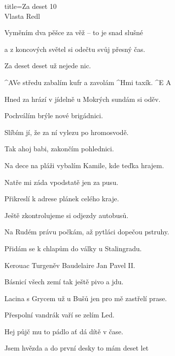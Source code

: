 \begin{song}{title=\predtitle\centering Za deset 10 \\\large Vlasta Redl  \vspace*{-0.3cm}}
{\begin{centerjustified}
\begin{varwidth}[t]{0.55\textwidth}
	Vyměním dva pěšce za věž -- to je snad slušné

	a z koncových světel si odečtu svůj přesný čas.

	Za deset deset už nejede nic.

	^{A}Ve středu zabalím kufr a zavolám ^{Hmi \z}taxík. ^{E A}

\end{varwidth}


\begin{varwidth}[t]{0.70\textwidth}\setlength{\parindent}{0.0cm}  %
	Hned za hrází v jídelně u Mokrých sundám si oděv.

	Pochválím brýle nové brigádnici.

	Slíbím jí, že za ní vylezu po hromosvodě.

	Tak ahoj babi, zakončím pohlednici.

	Na dece na pláži vybalím Kamile, kde teďka hrajem.

	Natře mi záda vpodstatě jen za pusu.

	Přikreslí k adrese plánek celého kraje.

	Ještě zkontrolujeme si odjezdy autobusů.


	Na Rudém právu počkám, až pytláci dopečou pstruhy.

	Přidám se k chlapům do války u Stalingradu.

	Kerouac Turgeněv Baudelaire Jan Pavel II.

	Básnicí všech zemí tak ještě pivo a jdu.

	Lacina s Grycem už u Bušů jen pro mě zastřelí prase.

	Přespolní vandrák vaří se zelím Led.

	Hej půjč mu to pádlo ať dá dítě v čase.

	Jsem hvězda a do první desky to mám deset let



\end{varwidth}\mezisloupci\begin{varwidth}[t]{0.35\textwidth}\setlength{\parindent}{0.05cm}

\end{varwidth}
\end{centerjustified}
}

\setcounter{Slokočet}{0}
\end{song}
